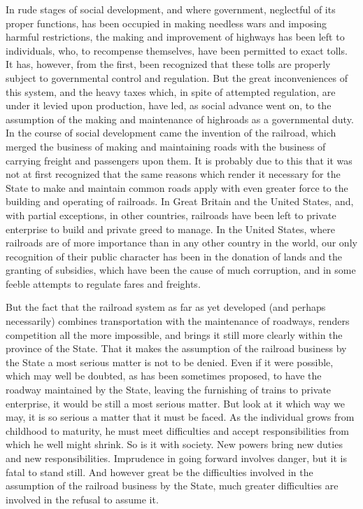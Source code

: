 \documentclass{book}
\begin{document}
In rude stages of social development, and where government, neglectful of its proper functions, has been occupied in making needless wars and imposing harmful restrictions, the making and improvement of highways has been left to individuals, who, to recompense themselves, have been permitted to exact tolls. It has, however, from the first, been recognized that these tolls are properly subject to governmental control and regulation. But the great inconveniences of this system, and the heavy taxes which, in spite of attempted regulation, are under it levied upon production, have led, as social advance went on, to the assumption of the making and maintenance of highroads as a governmental duty. In the course of social development came the invention of the railroad, which merged the business of making and maintaining roads with the business of carrying freight and passengers upon them. It is probably due to this that it was not at first recognized that the same reasons which render it necessary for the State to make and maintain common roads apply with even greater force to the building and operating of railroads. In Great Britain and the United States, and, with partial exceptions, in other countries, railroads have been left to private enterprise to build and private greed to manage. In the United States, where railroads are of more importance than in any other country in the world, our only recognition of their public character has been in the donation of lands and the granting of subsidies, which have been the cause of much corruption, and in some feeble attempts to regulate fares and freights.

But the fact that the railroad system as far as yet developed (and perhaps necessarily) combines transportation with the maintenance of roadways, renders competition all the more impossible, and brings it still more clearly within the province of the State. That it makes the assumption of the railroad business by the State a most serious matter is not to be denied. Even if it were possible, which may well be doubted, as has been sometimes proposed, to have the roadway maintained by the State, leaving the furnishing of trains to private enterprise, it would be still a most serious matter. But look at it which way we may, it is so serious a matter that it must be faced. As the individual grows from childhood to maturity, he must meet difficulties and accept responsibilities from which he well might shrink. So is it with society. New powers bring new duties and new responsibilities. Imprudence in going forward involves danger, but it is fatal to stand still. And however great be the difficulties involved in the assumption of the railroad business by the State, much greater difficulties are involved in the refusal to assume it.
\end{document}
